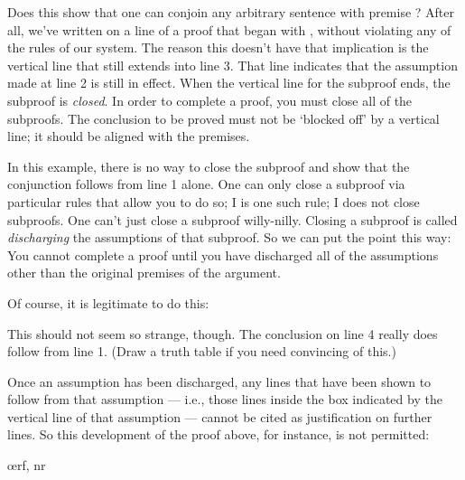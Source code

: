 \begin{ndproof}
	\metaA{}
	\open
		\metaB{}
		 
	\close
\end{ndproof}

Does this show that one can conjoin any arbitrary sentence \metaB{} with premise \metaA{}? After all, we've written \metaB{}\eand\metaA{} on a line of a proof that began with \metaA{}, without violating any of the rules of our system. The reason this doesn't have that implication is the vertical line that still extends into line 3. That line indicates that the assumption made at line 2 is still in effect. When the vertical line for the subproof ends, the subproof is \emph{closed}. In order to complete a proof, you must close all of the subproofs. The conclusion to be proved must not be `blocked off' by a vertical line; it should be aligned with the premises.

In this example, there is no way to close the subproof and show that the conjunction follows from line 1 alone. One can only close a subproof via particular rules that allow you to do so; {\eif}I is one such rule; {\eand}I does not close subproofs. One can't just close a subproof willy-nilly. Closing a subproof is called \emph{discharging} the assumptions of that subproof. So we can put the point this way: You cannot complete a proof until you have discharged all of the assumptions other than the original premises of the argument.

Of course, it is legitimate to do this:

\begin{ndproof}
	\metaA{}
	\open
		\metaB{}
		 
	\close
	 
\end{ndproof}

This should not seem so strange, though. The conclusion on line 4 really does follow from line 1. (Draw a truth table if you need convincing of this.) 

Once an assumption has been discharged, any lines that have been shown to follow from that assumption --- i.e., those lines inside the box indicated by the vertical line of that assumption --- cannot be cited as justification on further lines. So this development of the proof above, for instance, is not permitted:

\begin{ndproof}
	\open
		\oe{rf, nr}
	\close
\end{ndproof}

